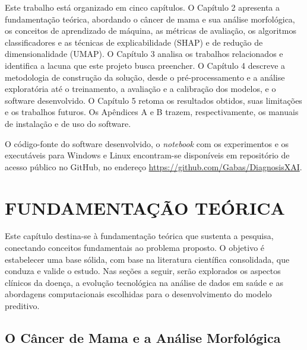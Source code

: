 \documentclass[
    12pt
    ,oneside
    ,a4paper
    ,chapter=TITLE
    ,section=TITLE
    ,sumario=abnt-6027-2012
    ,english,brazil]{abntex2} %
\begin{document}
Este trabalho está organizado em cinco capítulos. O Capítulo 2 apresenta a fundamentação teórica, abordando o câncer de mama e sua análise morfológica, os conceitos de aprendizado de máquina, as métricas de avaliação, os algoritmos classificadores e as técnicas de explicabilidade (SHAP) e de redução de dimensionalidade (UMAP). O Capítulo 3 analisa os trabalhos relacionados e identifica a lacuna que este projeto busca preencher. O Capítulo 4 descreve a metodologia de construção da solução, desde o pré-processamento e a análise exploratória até o treinamento, a avaliação e a calibração dos modelos, e o software desenvolvido. O Capítulo 5 retoma os resultados obtidos, suas limitações e os trabalhos futuros. Os Apêndices A e B trazem, respectivamente, os manuais de instalação e de uso do software.

O código-fonte do software desenvolvido, o \textit{notebook} com os experimentos e os executáveis para Windows e Linux encontram-se disponíveis em repositório de acesso público no GitHub, no endereço \url{https://github.com/Gabas/DiagnosisXAI}.

\chapter{FUNDAMENTAÇÃO TEÓRICA}
\label{cap:fundamentacao}

Este capítulo destina-se à fundamentação teórica que sustenta a pesquisa, conectando conceitos fundamentais ao problema proposto. O objetivo é estabelecer uma base sólida, com base na literatura científica consolidada, que conduza e valide o estudo. Nas seções a seguir, serão explorados os aspectos clínicos da doença, a evolução tecnológica na análise de dados em saúde e as abordagens computacionais escolhidas para o desenvolvimento do modelo preditivo.

\section{O Câncer de Mama e a Análise Morfológica}
\end{document}
